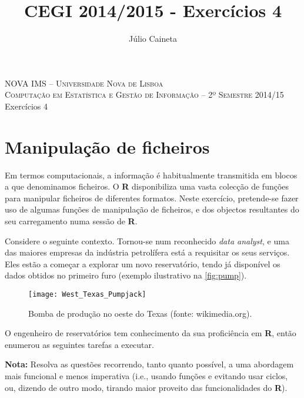 \documentclass{exam}
\author{Júlio Caineta}
\title{CEGI 2014/2015 - Exercícios 4}
\begin{document}
 
\begin{center}
\textsc {\small NOVA IMS -- Universidade Nova de Lisboa} \\
\textsc {Computação em Estatística e Gestão de Informação -- 2º Semestre 2014/15}
\vspace{5mm} \\
{\large Exercícios 4}
\end{center}
 
\vspace{5mm}

\section*{Manipulação de ficheiros}

Em termos computacionais, a informação é habitualmente transmitida em blocos a que denominamos ficheiros. O \textbf{R} disponibiliza uma vasta colecção de funções para manipular ficheiros de diferentes formatos. Neste exercício, pretende-se fazer uso de algumas funções de manipulação de ficheiros, e dos objectos resultantes do seu carregamento numa sessão de \textbf{R}.

Considere o seguinte contexto. Tornou-se num reconhecido \textit{data analyst}, e uma das maiores empresas da indústria petrolífera está a requisitar os seus serviços. Eles estão a começar a explorar um novo reservatório, tendo já disponível os dados obtidos no primeiro furo (exemplo ilustrativo na \autoref{fig:pump}).

\begin{figure}[h]
	\centering
	\texttt{[image: West\_Texas\_Pumpjack]}
	\caption{Bomba de produção no oeste do Texas (fonte: wikimedia.org).}
	\label{fig:pump}
\end{figure}

O engenheiro de reservatórios tem conhecimento da sua proficiência em \textbf{R}, então enumerou as seguintes tarefas a executar.

\textbf{Nota:} Resolva as questões recorrendo, tanto quanto possível, a uma abordagem mais funcional e menos imperativa (i.e., usando funções e evitando usar ciclos, ou, dizendo de outro modo, tirando maior proveito das funcionalidades do \textbf{R}).
\end{document}
